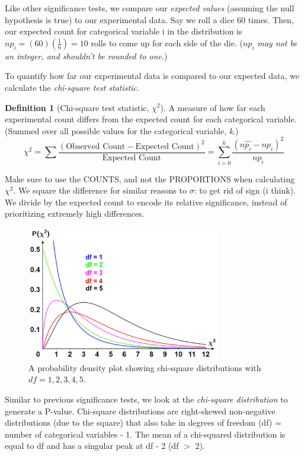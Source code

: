 \documentclass[12pt, a4paper]{article}
\theoremstyle{definition}
\newtheorem{definition}{Definition}
\begin{document}
Like other significance tests, we compare our \textit{expected values} (assuming the null hypothesis is true) to our experimental data.
Say we roll a dice 60 times. Then, our expected count for categorical variable i in the distribution is $np_i = (60)(\frac{1}{6}) = 10$ rolls to come up for each side of the die.
($np_i$ \textit{may not be an integer, and shouldn't be rounded to one.})

To quantify how far our experimental data is compared to our expected data, we calculate the \textit{chi-square test statistic}.

\begin{definition}[Chi-square test statistic, $\chi^2$]
    A measure of how far each experimental count differs from the expected count for each categorical variable. (Summed over all possible values for the categorical variable, \textit{k}.)
    \[\chi^2 = \sum \frac{(\textrm{Observed Count} - \textrm{Expected Count})^2}{\textrm{Expected Count}} 
                = \sum_{i=0}^{k} \frac{(n\hat{p_i} - np_i)^2}{np_i}\]
\end{definition}

Make sure to use the COUNTS, and not the PROPORTIONS when calculating $\chi^2$.
We square the difference for similar reasons to $\sigma$: to get rid of sign (i think).
We divide by the expected count to encode its relative significance, instead of prioritizing extremely high differences.

\begin{figure}[t]
    \centering
    \includegraphics[width=0.75\textwidth]{chi-square-distribution.png}
    \caption{A probability density plot showing chi-square distributions with $df = 1, 2, 3, 4, 5$.}
    \label{fig:chi-square-dist}
\end{figure}

Similar to previous significance tests, we look at the \textit{chi-square distribution} to generate a P-value.
Chi-square distributions are right-skewed non-negative distributions (due to the square) that also take in degrees of freedom (df) = number of categorical variables - 1.
The mean of a chi-squared distribution is equal to df and has a singular peak at df - 2 (df $>$ 2).
\end{document}
